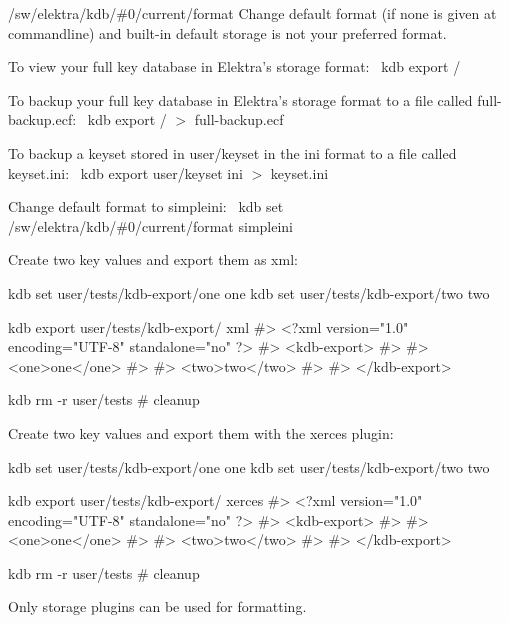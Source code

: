 \begin{DoxyItemize}
\item {\ttfamily /sw/elektra/kdb/\#0/current/format} Change default format (if none is given at commandline) and built-\/in default {\ttfamily storage} is not your preferred format.
\end{DoxyItemize}

To view your full key database in Elektra’s {\ttfamily storage} format\+:~\newline
 {\ttfamily kdb export /}~\newline


To backup your full key database in Elektra’s {\ttfamily storage} format to a file called {\ttfamily full-\/backup.\+ecf}\+:~\newline
 {\ttfamily kdb export / $>$ full-\/backup.\+ecf}~\newline


To backup a keyset stored in {\ttfamily user/keyset} in the {\ttfamily ini} format to a file called {\ttfamily keyset.\+ini}\+:~\newline
 {\ttfamily kdb export user/keyset ini $>$ keyset.\+ini}~\newline


Change default format to {\ttfamily simpleini}\+:~\newline
 {\ttfamily kdb set /sw/elektra/kdb/\#0/current/format simpleini}

Create two key values and export them as {\ttfamily xml}\+:


\begin{DoxyCode}
kdb set user/tests/kdb-export/one one
kdb set user/tests/kdb-export/two two

kdb export user/tests/kdb-export/ xml
#> <?xml version="1.0" encoding="UTF-8" standalone="no" ?>
#> <kdb-export>
#>
#>   <one>one</one>
#>
#>   <two>two</two>
#>
#> </kdb-export>


kdb rm -r user/tests
# cleanup
\end{DoxyCode}


Create two key values and export them with the {\ttfamily xerces} plugin\+:


\begin{DoxyCode}
kdb set user/tests/kdb-export/one one
kdb set user/tests/kdb-export/two two

kdb export user/tests/kdb-export/ xerces
#> <?xml version="1.0" encoding="UTF-8" standalone="no" ?>
#> <kdb-export>
#>
#>   <one>one</one>
#>
#>   <two>two</two>
#>
#> </kdb-export>

kdb rm -r user/tests
# cleanup
\end{DoxyCode}



\begin{DoxyItemize}
\item Only storage plugins can be used for formatting. 
\end{DoxyItemize}